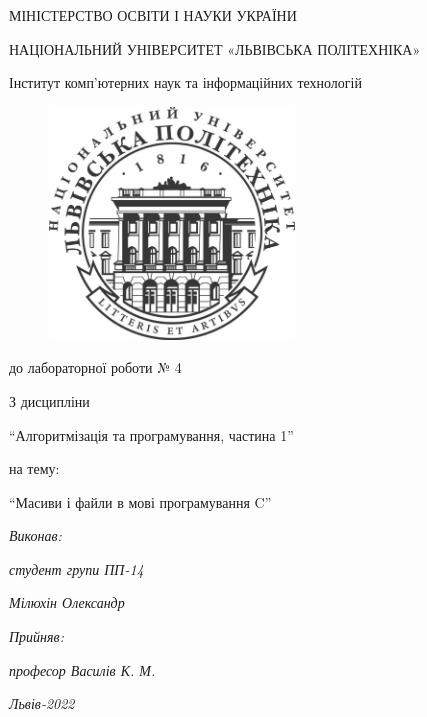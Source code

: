 \documentclass[14pt]{extreport}
\begin{document}
\pagestyle{empty}
\begin{center}

	{\fontsize{14}{24}\selectfont МІНІСТЕРСТВО ОСВІТИ І НАУКИ УКРАЇНИ

	НАЦІОНАЛЬНИЙ УНІВЕРСИТЕТ «ЛЬВІВСЬКА ПОЛІТЕХНІКА»

	Інститут комп'ютерних наук та інформаційних технологій

	}

	\vspace{90.4pt} %
	\begin{figure}[h]
		\centering
		\includegraphics[width=6.5cm,keepaspectratio]{../../../lpnu.png}
	\end{figure}

	{\fontsize{18}{29}\selectfont{Звіт}

	{до лабораторної роботи № 4}

	{З дисципліни}

	{``Алгоритмізація та програмування, частина 1''}

	{на тему:}

	{``Масиви і файли в мові програмування C''}

	}
\end{center}

\vspace{12.1pt} %
	{\fontsize{14}{22.4}\selectfont
\begin{flushright}
	\textit{Виконав:}

	\textit{студент групи ПП-14}

	\textit{Мілюхін Олександр}

	\textit{Прийняв:}

	\textit{професор Василів К. М.}
\end{flushright}
\vspace{37.4pt} %
\begin{center}
\textit{Львів-2022}
\vspace{37.4pt} %
\end{center}
	}
\end{document}
